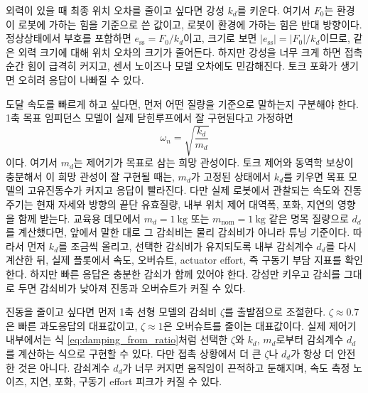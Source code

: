 외력이 있을 때 최종 위치 오차를 줄이고 싶다면 강성 $k_d$를 키운다.
여기서 $F_0$는 환경이 로봇에 가하는 힘을 기준으로 쓴 값이고, 로봇이 환경에 가하는 힘은 반대 방향이다.
정상상태에서 부호를 포함하면 $e_{\mathrm{ss}}=F_0/k_d$이고, 크기로 보면 $|e_{\mathrm{ss}}|=|F_0|/k_d$이므로, 같은 외력 크기에 대해 위치 오차의 크기가 줄어든다.
하지만 강성을 너무 크게 하면 접촉 순간 힘이 급격히 커지고, 센서 노이즈나 모델 오차에도 민감해진다.
토크 포화가 생기면 오히려 응답이 나빠질 수 있다.

도달 속도를 빠르게 하고 싶다면, 먼저 어떤 질량을 기준으로 말하는지 구분해야 한다.
1축 목표 임피던스 모델이 실제 닫힌루프에서 잘 구현된다고 가정하면
\begin{equation}
  \omega_n=\sqrt{\frac{k_d}{m_d}}
\end{equation}
이다.
여기서 $m_d$는 제어기가 목표로 삼는 희망 관성이다.
토크 제어와 동역학 보상이 충분해서 이 희망 관성이 잘 구현될 때는, $m_d$가 고정된 상태에서 $k_d$를 키우면 목표 모델의 고유진동수가 커지고 응답이 빨라진다.
다만 실제 로봇에서 관찰되는 속도와 진동 주기는 현재 자세와 방향의 끝단 유효질량, 내부 위치 제어 대역폭, 포화, 지연의 영향을 함께 받는다.
교육용 데모에서 $m_d=1~\mathrm{kg}$ 또는 $m_{\mathrm{nom}}=1~\mathrm{kg}$ 같은 명목 질량으로 $d_d$를 계산했다면, 앞에서 말한 대로 그 감쇠비는 물리 감쇠비가 아니라 튜닝 기준이다.
따라서 먼저 $k_d$를 조금씩 올리고, 선택한 감쇠비가 유지되도록 내부 감쇠계수 $d_d$를 다시 계산한 뒤, 실제 플롯에서 속도, 오버슈트, actuator effort, 즉 구동기 부담 지표를 확인한다.
하지만 빠른 응답은 충분한 감쇠가 함께 있어야 한다.
강성만 키우고 감쇠를 그대로 두면 감쇠비가 낮아져 진동과 오버슈트가 커질 수 있다.

진동을 줄이고 싶다면 먼저 1축 선형 모델의 감쇠비 $\zeta$를 출발점으로 조절한다.
$\zeta \approx 0.7$은 빠른 과도응답의 대표값이고, $\zeta \approx 1$은 오버슈트를 줄이는 대표값이다.
실제 제어기 내부에서는 식 \eqref{eq:damping_from_ratio}처럼 선택한 $\zeta$와 $k_d$, $m_d$로부터 감쇠계수 $d_d$를 계산하는 식으로 구현할 수 있다.
다만 접촉 상황에서 더 큰 $\zeta$나 $d_d$가 항상 더 안전한 것은 아니다.
감쇠계수 $d_d$가 너무 커지면 움직임이 끈적하고 둔해지며, 속도 측정 노이즈, 지연, 포화, 구동기 effort 피크가 커질 수 있다.

